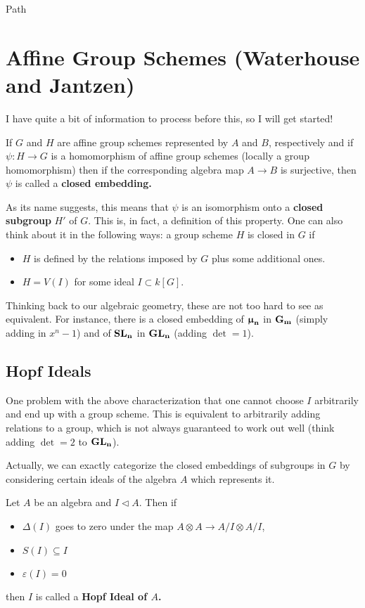 \documentclass[12pt]{article}
\theoremstyle{nonumberbreak}
\theoremstyle{changebreak}
\theoremstyle{nonumberplain}
\theoremstyle{change}
\newcommand*{\Gm}{\ensuremath\mathbf{G_m}}
\newcommand*{\GL}[1]{\ensuremath\mathbf{GL_#1}}
\newcommand*{\SL}[1]{\ensuremath\mathbf{SL_#1}}
\newcommand*{\mun}[1]{\ensuremath\mathbf{\bm\upmu_#1}}
\begin{document}
Path 


\newpage
\section{Affine Group Schemes (Waterhouse and Jantzen)}
I have quite a bit of information to process before this, so I will get started!
\begin{defn}
	If $G$ and $H$ are affine group schemes represented by $A$ and $B$, respectively and
	if $\psi:H\to G$ is a homomorphism of affine group schemes (locally a group homomorphism)
	then if the corresponding algebra map $A\to B$ is surjective, then $\psi$ is called
	a \textbf{closed embedding.}
\end{defn}

As its name suggests, this means that $\psi$ is an isomorphism onto a \textbf{closed subgroup}
$H'$ of $G$. This is, in fact, a definition of this property. One can also think about 
it in the following ways: a group scheme $H$ is closed in $G$ if
\begin{itemize}
	\item $H$ is defined by the relations imposed by $G$ plus some additional ones.
	\item $H=V(I)$ for some ideal $I\subset k[G]$. 
\end{itemize}
Thinking back to our algebraic geometry, these are not too hard to see as equivalent. 
For instance, there is a closed embedding of $\mun n$ in $\Gm$ (simply adding in $x^n-1$)
and of $\SL{n}$ in $\GL{n}$ (adding $\det = 1$).

\subsection{Hopf Ideals}
One problem with the above characterization that one cannot choose $I$ arbitrarily and end
up with a group scheme. This is equivalent to arbitrarily adding relations to a group, which is
not always guaranteed to work out well (think adding $\det = 2$ to $\GL n$).

Actually, we can exactly categorize the closed embeddings of subgroups in $G$ by considering certain
ideals of the algebra $A$ which represents it. 
\begin{defn}
	Let $A$ be an algebra and $I\lhd A$. Then if 
	\begin{itemize}
		\item $\Delta(I)$ goes to zero under the map $A\otimes A\to A/I\otimes A/I$,
		\item $S(I)\subseteq I$
		\item $\varepsilon(I)=0$
	\end{itemize}
	then $I$ is called a \textbf{Hopf Ideal of $A$.}
\end{defn}
\end{document}
